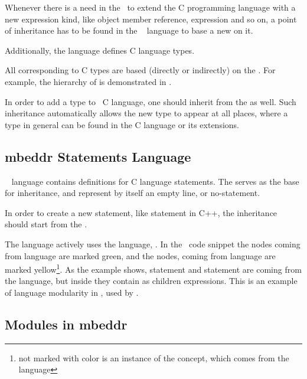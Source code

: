 Whenever there is a need in the \cpppl\ to extend the C programming language with a new expression kind, like 
object member reference,  expression and so on, a point of inheritance has to be found in the 
\mbdr\  language to base a new  on it.

Additionally, the  language defines  C language types. 


All  corresponding to C types are based (directly or indirectly) on the  .
For example, the hierarchy of   is demonstrated in . 

In order to add a type to \mbdr\ C language, one should inherit from the   as well.
Such inheritance automatically allows the new type to appear at all places, where a type in general can be found
in the C language or its extensions.


\subsection{mbeddr Statements Language}

\mbdr\  language contains definitions for C language statements. The   serves as the
base for inheritance, and represent by itself an empty line, or no-statement.

In order to create a new statement, like  statement in C++, the inheritance should start from the  .


The  language actively uses the  language, . In the \mbdr\ code snippet
the nodes coming from  language are marked green, and the nodes, coming from  language are
marked yellow\footnote{not marked with color is an instance of the  concept, which comes from the  language}. As the example shows,  statement and  statement are coming from the  language,
but inside they contain as children expressions. This is an example of language modularity in \jbmps, used by \mbdr.

\subsection{Modules in mbeddr}
\label{mbdrmodules}

